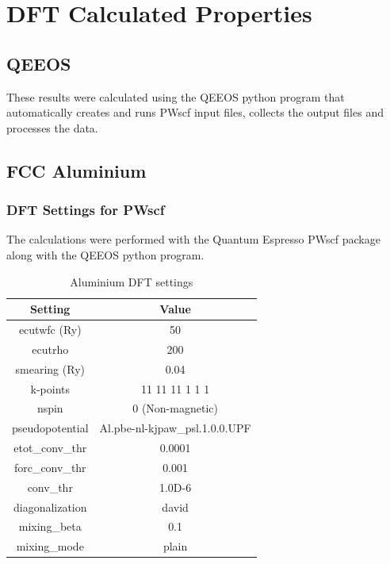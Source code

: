 \chapter{DFT Calculated Properties}
\label{chapter:dftcalculatedproperties}

\section{QEEOS}

These results were calculated using the QEEOS python program that automatically creates and runs PWscf input files, collects the output files and processes the data.






\clearpage
\FloatBarrier
\section{FCC Aluminium}

\FloatBarrier
\subsection{DFT Settings for PWscf}

The calculations were performed with the Quantum Espresso PWscf package along with the QEEOS python program.

\begin{table}[h]
\begin{center}
\renewcommand{\arraystretch}{1.2}
\begin{tabular}{c c}
\hline\hline
Setting & Value \\
\hline\hline
ecutwfc (Ry) & 50 \\
ecutrho & 200 \\
smearing (Ry) & 0.04 \\
k-points &  11 11 11 1 1 1  \\
nspin &  0  (Non-magnetic)   \\
pseudopotential &   Al.pbe-nl-kjpaw\_psl.1.0.0.UPF   \\
etot\_conv\_thr & 0.0001 \\
forc\_conv\_thr & 0.001 \\ 
conv\_thr & 1.0D-6 \\ 
diagonalization & david \\ 
mixing\_beta & 0.1 \\ 
mixing\_mode & plain \\ 
\hline\hline
\end{tabular}
\end{center}
\caption{Aluminium DFT settings}
\label{table:alfccdftsettings}
\end{table}



